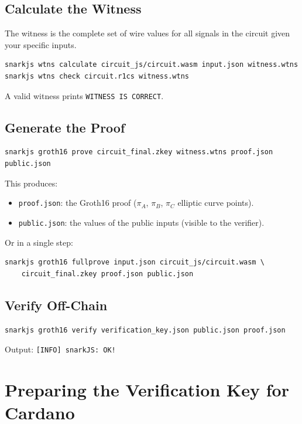 \subsection*{Calculate the Witness}

The witness is the complete set of wire values for all signals in the circuit given your specific inputs.

\begin{verbatim}
snarkjs wtns calculate circuit_js/circuit.wasm input.json witness.wtns
snarkjs wtns check circuit.r1cs witness.wtns
\end{verbatim}

A valid witness prints \texttt{WITNESS IS CORRECT}.

\subsection*{Generate the Proof}

\begin{verbatim}
snarkjs groth16 prove circuit_final.zkey witness.wtns proof.json public.json
\end{verbatim}

This produces:
\begin{itemize}
  \item \texttt{proof.json}: the Groth16 proof ($\pi_A$, $\pi_B$, $\pi_C$ elliptic curve points).
  \item \texttt{public.json}: the values of the public inputs (visible to the verifier).
\end{itemize}

Or in a single step:

\begin{verbatim}
snarkjs groth16 fullprove input.json circuit_js/circuit.wasm \
    circuit_final.zkey proof.json public.json
\end{verbatim}

\subsection*{Verify Off-Chain}

\begin{verbatim}
snarkjs groth16 verify verification_key.json public.json proof.json
\end{verbatim}

Output: \texttt{[INFO] snarkJS: OK!}

\section{Preparing the Verification Key for Cardano} \label{sec:vk-cardano}

